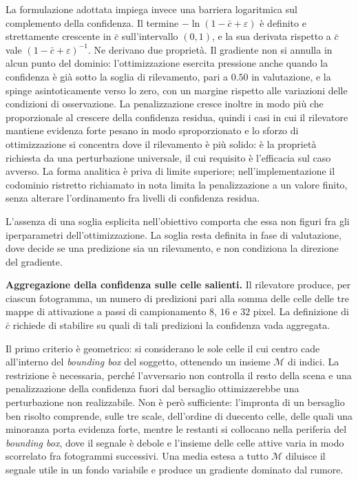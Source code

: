 \ifstampa\documentclass[a4paper,12pt,twoside,openright]{report}\else\documentclass[a4paper,12pt]{report}\fi
\newif\ifrevisione \revisionefalse
\DeclareRobustCommand{\rev}[1]{\ifrevisione{\color{blue!65!black}#1}\else#1\fi}
\begin{document}
La formulazione adottata impiega invece una barriera logaritmica sul complemento
della confidenza. Il termine $-\ln(1 - \bar{c} + \varepsilon)$ è definito e
strettamente crescente in $\bar{c}$ \rev{sull'intervallo $(0,1)$}, e la sua derivata
rispetto a $\bar{c}$ vale $(1 - \bar{c} + \varepsilon)^{-1}$. Ne derivano due
proprietà. Il gradiente non si annulla in alcun punto del dominio:
l'ottimizzazione esercita pressione anche quando la confidenza è già sotto la
soglia di rilevamento\rev{, pari a $0.50$ in valutazione}, e la spinge asintoticamente verso lo zero, con un
margine rispetto alle variazioni delle condizioni di osservazione. La
penalizzazione cresce inoltre in modo più che proporzionale al crescere della
confidenza residua, quindi i casi in cui il rilevatore mantiene evidenza forte
pesano in modo sproporzionato e lo sforzo di ottimizzazione si concentra dove il
rilevamento è più solido: è la proprietà richiesta da una perturbazione
universale, il cui requisito è l'efficacia sul caso avverso. La forma analitica
è priva di limite superiore; nell'implementazione il codominio ristretto
richiamato in nota limita la penalizzazione a un valore finito, senza alterare
l'ordinamento fra livelli di confidenza residua.

L'assenza di una soglia esplicita nell'obiettivo comporta che essa non figuri
fra gli iperparametri dell'ottimizzazione. La soglia resta definita in fase di
valutazione, dove decide se una predizione sia un rilevamento, e non
condiziona la direzione del gradiente.

\textbf{Aggregazione della confidenza sulle celle salienti.}
\label{sec:topk}
Il rilevatore produce, per ciascun fotogramma, un numero di predizioni pari alla
somma delle celle delle tre mappe di attivazione a passi di campionamento $8$,
$16$ e $32$ pixel. La definizione di $\bar{c}$ richiede di stabilire su quali di
tali predizioni la confidenza vada aggregata.

Il primo criterio è geometrico: si considerano le sole celle il cui centro cade
all'interno del \textit{bounding box} del soggetto, ottenendo un insieme
$\mathcal{M}$ di indici. La restrizione è necessaria, perché l'avversario non
controlla il resto della scena e una penalizzazione della confidenza fuori dal
bersaglio ottimizzerebbe una perturbazione non realizzabile. Non è però
sufficiente: l'impronta di un bersaglio ben risolto comprende, sulle tre scale,
dell'ordine di duecento celle, delle quali una minoranza porta evidenza forte,
mentre le restanti si collocano nella periferia del \textit{bounding box}, dove
il segnale è debole e l'insieme delle celle attive varia in modo scorrelato fra
fotogrammi successivi. Una media estesa a tutto $\mathcal{M}$ diluisce il
segnale utile in un fondo variabile e produce un gradiente dominato dal rumore.
\end{document}
